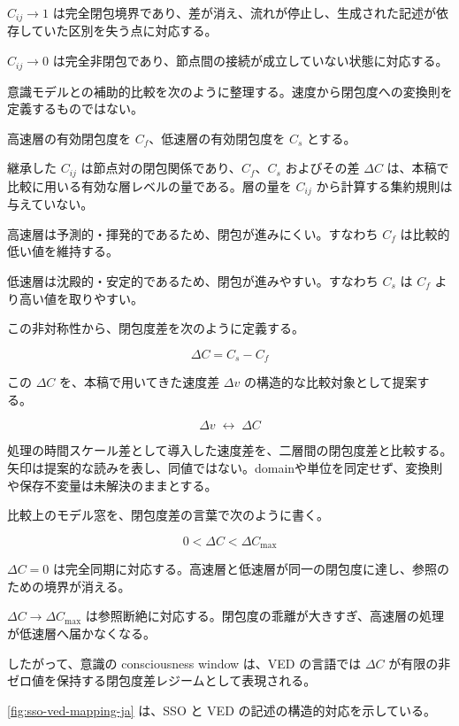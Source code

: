$C_{ij} \to 1$ は完全閉包境界であり、差が消え、流れが停止し、生成された記述が依存していた区別を失う点に対応する。

$C_{ij} \to 0$ は完全非閉包であり、節点間の接続が成立していない状態に対応する。

意識モデルとの補助的比較を次のように整理する。速度から閉包度への変換則を定義するものではない。

高速層の有効閉包度を $C_f$、低速層の有効閉包度を $C_s$ とする。

継承した $C_{ij}$ は節点対の閉包関係であり、$C_f$、$C_s$ およびその差 $\Delta C$ は、本稿で比較に用いる有効な層レベルの量である。層の量を $C_{ij}$ から計算する集約規則は与えていない。

高速層は予測的・揮発的であるため、閉包が進みにくい。すなわち $C_f$ は比較的低い値を維持する。

低速層は沈殿的・安定的であるため、閉包が進みやすい。すなわち $C_s$ は $C_f$ より高い値を取りやすい。

この非対称性から、閉包度差を次のように定義する。

\begin{equation}
\Delta C = C_s - C_f
\end{equation}

この $\Delta C$ を、本稿で用いてきた速度差 $\Delta v$ の構造的な比較対象として提案する。

\begin{equation}
\Delta v \;\leftrightarrow\; \Delta C
\end{equation}

処理の時間スケール差として導入した速度差を、二層間の閉包度差と比較する。矢印は提案的な読みを表し、同値ではない。domainや単位を同定せず、変換則や保存不変量は未解決のままとする。

比較上のモデル窓を、閉包度差の言葉で次のように書く。

\begin{equation}
0 < \Delta C < \Delta C_{\max}
\end{equation}

$\Delta C = 0$ は完全同期に対応する。高速層と低速層が同一の閉包度に達し、参照のための境界が消える。

$\Delta C \to \Delta C_{\max}$ は参照断絶に対応する。閉包度の乖離が大きすぎ、高速層の処理が低速層へ届かなくなる。

したがって、意識の consciousness window は、VED の言語では $\Delta C$ が有限の非ゼロ値を保持する閉包度差レジームとして表現される。

\cref{fig:sso-ved-mapping-ja} は、SSO と VED の記述の構造的対応を示している。

